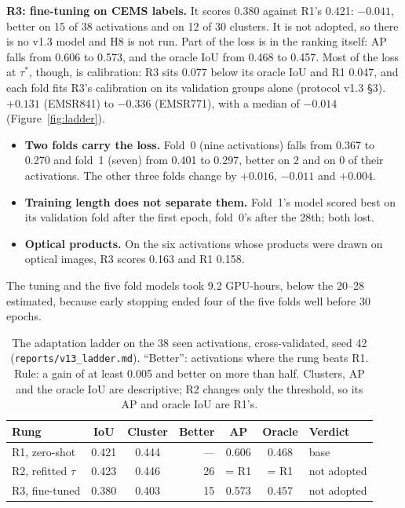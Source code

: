 \documentclass[10pt,twocolumn,a4paper]{article}
\newcommand{\file}[1]{\nolinkurl{#1}}
\begin{document}
\textbf{R3: fine-tuning on CEMS labels.} It scores 0.380 against R1's 0.421: $-0.041$, better on 15 of 38 activations
and on 12 of 30 clusters. It is not adopted, so there is no v1.3 model and H8 is not run. Part of the loss is in
the ranking itself: AP falls from 0.606 to 0.573, and the oracle IoU from 0.468 to 0.457. Most of the loss at
$\tau^{*}$, though, is calibration: R3 sits 0.077 below its oracle IoU and R1 0.047, and each fold fits R3's
calibration on its validation groups alone (protocol v1.3 §3).
$+0.131$ (EMSR841) to $-0.336$ (EMSR771), with a median of $-0.014$ (Figure~\ref{fig:ladder}).
\begin{itemize}
  \item \textbf{Two folds carry the loss.} Fold~0 (nine activations) falls from 0.367 to 0.270 and fold~1 (seven)
    from 0.401 to 0.297, better on 2 and on 0 of their activations. The other three folds change by $+0.016$,
    $-0.011$ and $+0.004$.
  \item \textbf{Training length does not separate them.} Fold~1's model scored best on its validation fold after the
    first epoch, fold~0's after the 28th; both lost.
  \item \textbf{Optical products.} On the six activations whose products were drawn on optical images, R3 scores
    0.163 and R1 0.158.
\end{itemize}
The tuning and the five fold models took 9.2 GPU-hours, below the 20--28 estimated, because early stopping ended four
of the five folds well before 30 epochs.

\begin{table}[t]
\centering\small
\caption{The adaptation ladder on the 38 seen activations, cross-validated, seed 42 (\file{reports/v13_ladder.md}).
``Better'': activations where the rung beats R1. Rule: a gain of at least 0.005 and better on more than half.
Clusters, AP and the oracle IoU are descriptive; R2 changes only the threshold, so its AP and oracle IoU are R1's.}
\label{tab:ladder}
\setlength{\tabcolsep}{2.6pt}
\begin{tabular}{@{}l c c r c c l@{}}
\toprule
Rung & IoU & Cluster & Better & AP & Oracle & Verdict \\
\midrule
R1, zero-shot & 0.421 & 0.444 & --- & 0.606 & 0.468 & base \\
R2, refitted $\tau$ & 0.423 & 0.446 & 26 & = R1 & = R1 & not adopted \\
R3, fine-tuned & 0.380 & 0.403 & 15 & 0.573 & 0.457 & not adopted \\
\bottomrule
\end{tabular}
\end{table}
\end{document}
